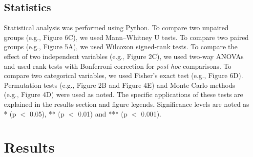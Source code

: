 \documentclass[11pt]{article}
\begin{document}
\subsection*{Statistics}
Statistical analysis was performed using Python. To compare two unpaired groups (e.g., Figure 6C), we used Mann–Whitney U tests. To compare two paired groups (e.g., Figure 5A), we used Wilcoxon signed-rank tests. To compare the effect of two independent variables (e.g., Figure 2C), we used two-way ANOVAs and used rank tests with Bonferroni correction for \emph{post hoc} comparisons. To compare two categorical variables, we used Fisher's exact test (e.g., Figure 6D). Permutation tests (e.g., Figure 2B and Figure 4E) and Monte Carlo methods (e.g., Figure 4D) were used as noted. The specific applications of these tests are explained in the results section and figure legends. Significance levels are noted as * (p $<$ 0.05), ** (p $<$ 0.01) and *** (p $<$ 0.001). 


\section*{Results}
\begin{comment}
This section should present the experimental findings clearly and succinctly. Only results essential to establish the main points of the work should be included.

Numerical data should be analyzed using appropriate statistical tests described in the Experimental Design and Statistical Analysis section. In the Results section, authors must provide detailed information for each statistical test applied including degrees of freedom and any estimates of effects size, should be reported in the Results section. Report exact p values rather than ranges (e.g., p = 0.026 rather than p < 0.05). There are many types of analyses that can be reported, but examples include F values (F(1, 72) = 14.5, p = 0.003, ANOVA), t values (t(10) = 2.98, p = 0.043, paired t-test), coefficient of determination (R2), and Bayes factors.
\end{comment}
\end{document}
